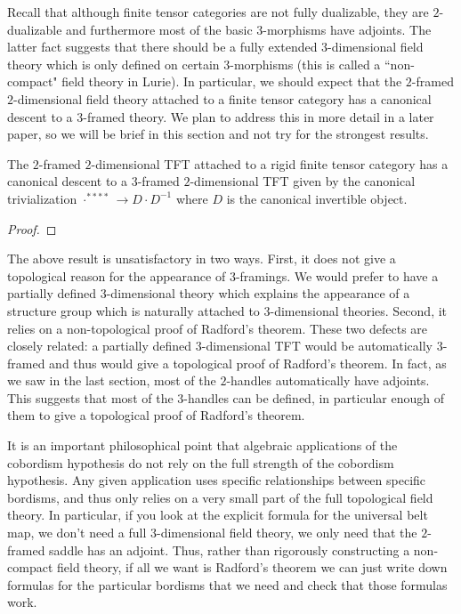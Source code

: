 \documentclass{amsart}
\begin{document}
Recall that although finite tensor categories are not fully dualizable, they are $2$-dualizable and furthermore most of the basic $3$-morphisms have adjoints.  The latter fact suggests that there should be a fully extended $3$-dimensional field theory which is only defined on certain $3$-morphisms (this is called a ``non-compact" field theory in Lurie).  In particular, we should expect that the $2$-framed $2$-dimensional field theory attached to a finite tensor category has a canonical descent to a $3$-framed theory.  We plan to address this in more detail in a later paper, so we will be brief in this section and not try for the strongest results.

\begin{theorem}
The $2$-framed $2$-dimensional TFT attached to a rigid finite tensor category has a canonical descent to a $3$-framed $2$-dimensional TFT given by the canonical trivialization $\cdot^{****} \rightarrow D \cdot D^{-1}$ where $D$ is the canonical invertible object.
\end{theorem}
\begin{proof}
\end{proof}

The above result is unsatisfactory in two ways.  First, it does not give a topological reason for the appearance of $3$-framings.  We would prefer to have a partially defined $3$-dimensional theory which explains the appearance of a structure group which is naturally attached to $3$-dimensional theories.  Second, it relies on a non-topological proof of Radford's theorem.  These two defects are closely related: a partially defined $3$-dimensional TFT would be automatically $3$-framed and thus would give a topological proof of Radford's theorem.  In fact, as we saw in the last section, most of the $2$-handles automatically have adjoints.  This suggests that most of the $3$-handles can be defined, in particular enough of them to give a topological proof of Radford's theorem.

It is an important philosophical point that algebraic applications of the cobordism hypothesis do not rely on the full strength of the cobordism hypothesis.  Any given application uses specific relationships between specific bordisms, and thus only relies on a very small part of the full topological field theory.  In particular, if you look at the explicit formula for the universal belt map, we don't need a full $3$-dimensional field theory, we only need that the $2$-framed saddle has an adjoint.  Thus, rather than rigorously constructing a non-compact field theory, if all we want is Radford's theorem we can just write down formulas for the particular bordisms that we need and check that those formulas work.
\end{document}
